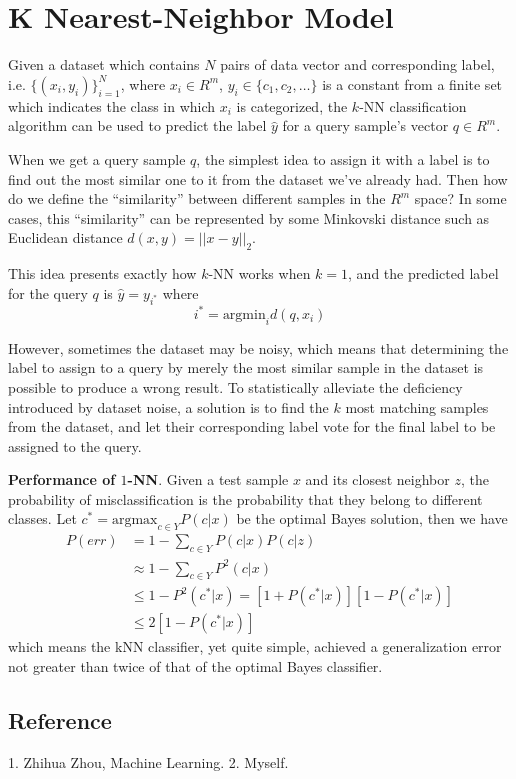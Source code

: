 \section{K Nearest-Neighbor Model}

Given a dataset which contains $N$ pairs of data vector and corresponding label,
i.e. $\{(x_i,y_i)\}_{i=1}^N$, where $x_i \in R^m$, $y_i \in \{c_1, c_2, \ldots\}$
is a constant from a finite set which indicates the class in which $x_i$ is
categorized, the $k$-NN classification algorithm can be used to predict the
label $\hat{y}$ for a query sample's vector $q \in R^m$.

When we get a query sample $q$, the simplest idea to assign it with a label is to
find out the most similar one to it from the dataset we've already had. Then
how do we define the ``similarity'' between different samples in the $R^m$
space? In some cases, this ``similarity'' can be represented by some Minkovski
distance such as Euclidean distance $d(x,y) = ||x-y||_2$.

This idea presents exactly how $k$-NN works when $k=1$, and the predicted label
for the query $q$ is $\hat{y} = y_{i^*}$ where $$i^* = \text{argmin}_i d(q, x_i)$$

However, sometimes the dataset may be noisy, which means that determining the
label to assign to a query by merely the most similar sample in the dataset
is possible to produce a wrong result. To statistically alleviate the deficiency
introduced by dataset noise, a solution is to find the $k$ most matching samples
from the dataset, and let their corresponding label vote for the final label
to be assigned to the query.

{\bf Performance of $1$-NN}. Given a test sample $x$ and its closest neighbor
$z$, the probability of misclassification is the probability that they belong
to different classes. Let $c^* = \text{argmax}_{c\in Y} P(c|x)$ be the optimal
Bayes solution, then we have
\begin{align}
	P(err) &= 1-\sum_{c\in Y} P(c|x)P(c|z) \\
		   &\approx 1-\sum_{c\in Y} P^2(c|x) \\
		   &\leqslant 1 - P^2(c^*|x) = [1+P(c^*|x)][1-P(c^*|x)] \\
		   &\leqslant 2[1-P(c^*|x)]
\end{align}
which means the kNN classifier, yet quite simple, achieved a generalization
error not greater than twice of that of the optimal Bayes classifier.

\subsection{Reference}

1. Zhihua Zhou, Machine Learning.
2. Myself.
